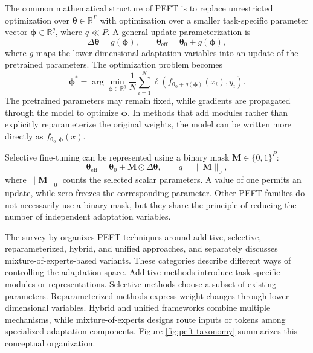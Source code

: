 The common mathematical structure of PEFT is to replace unrestricted
optimization over $\boldsymbol{\theta}\in\mathbb{R}^{P}$ with optimization
over a smaller task-specific parameter vector
$\boldsymbol{\phi}\in\mathbb{R}^{q}$, where $q\ll P$. A general update
parameterization is
\begin{equation}
    \Delta\boldsymbol{\theta}
    =
    g(\boldsymbol{\phi}),
    \qquad
    \boldsymbol{\theta}_{\mathrm{eff}}
    =
    \boldsymbol{\theta}_0+g(\boldsymbol{\phi}),
    \label{eq:peft-general-update}
\end{equation}
where $g$ maps the lower-dimensional adaptation variables into an update of
the pretrained parameters. The optimization problem becomes
\begin{equation}
    \boldsymbol{\phi}^{*}
    =
    \arg\min_{\boldsymbol{\phi}\in\mathbb{R}^{q}}
    \frac{1}{N}\sum_{i=1}^{N}
    \ell\!\left(
        f_{\boldsymbol{\theta}_0+g(\boldsymbol{\phi})}(x_i),y_i
    \right).
    \label{eq:peft-reduced-objective}
\end{equation}
The pretrained parameters may remain fixed, while gradients are propagated
through the model to optimize $\boldsymbol{\phi}$. In methods that add modules
rather than explicitly reparameterize the original weights, the model can be
written more directly as
$f_{\boldsymbol{\theta}_0,\boldsymbol{\phi}}(x)$.

Selective fine-tuning can be represented using a binary mask
$\mathbf{M}\in\{0,1\}^{P}$:
\begin{equation}
    \boldsymbol{\theta}_{\mathrm{eff}}
    =
    \boldsymbol{\theta}_0+
    \mathbf{M}\odot\Delta\boldsymbol{\theta},
    \qquad
    q=\|\mathbf{M}\|_0,
    \label{eq:peft-selection-mask}
\end{equation}
where $\|\mathbf{M}\|_0$ counts the selected scalar parameters. A value of
one permits an update, while zero freezes the corresponding parameter.
Other PEFT families do not necessarily use a binary mask, but they share the
principle of reducing the number of independent adaptation variables.

The survey by \textcite{prottasha2025peft} organizes PEFT techniques around
additive, selective, reparameterized, hybrid, and unified approaches, and
separately discusses mixture-of-experts-based variants. These categories
describe different ways of controlling the adaptation space. Additive
methods introduce task-specific modules or representations. Selective methods
choose a subset of existing parameters. Reparameterized methods express
weight changes through lower-dimensional variables. Hybrid and unified
frameworks combine multiple mechanisms, while mixture-of-experts designs
route inputs or tokens among specialized adaptation components. Figure
\ref{fig:peft-taxonomy} summarizes this conceptual organization.

